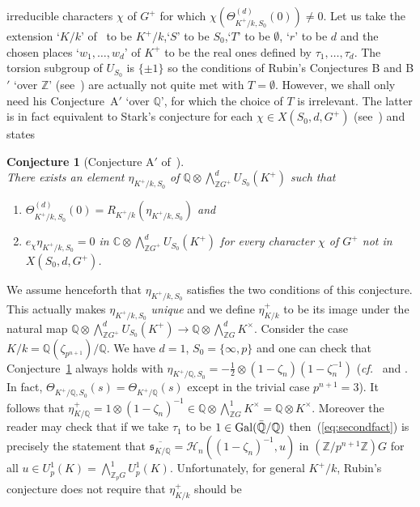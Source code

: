 \documentclass[12pt]{article}
\newtheorem{conj}{Conjecture}[section]
\newcounter{rem}[section]%
\newcommand{\barbbQ}{\ensuremath{\bar{\bbQ}}}
\newcommand{\bbC}{\ensuremath{\mathbb{C}}}
\newcommand{\bbQ}{\ensuremath{\mathbb{Q}}}
\newcommand{\bbZ}{\ensuremath{\mathbb{Z}}}
\newcommand{\cf}{\emph{cf.}}
\newcommand{\cH}{\ensuremath{\mathcal{H}}}
\newcommand{\fs}{\ensuremath{\mathfrak{s}}}
\newcommand{\Gal}{{\rm Gal}}
\newcommand{\half}{\frac{1}{2}}
\newcommand{\inv}{^{-1}}%
\newcommand{\refeq}[1]{~(\ref{eq:#1})}
\newcommand{\rem}{\refstepcounter{rem}\noindent{\sc Remark \therem}}%
\renewcommand{\therem}{\thesection.\arabic{rem}}
\newcommand{\pnpo}{\ensuremath{{p^{n+1}}}}
\begin{document}
irreducible characters $\chi$ of $G^+$ for which
$\chi(\Theta_{K^+/k, S_0}^{(d)}(0))\neq 0$. Let us take the extension
`$K/k$' of~\cite{Ru} to be $K^+/k$,`$S$' to be $S_0$,`$T$' to be $\emptyset$, `$r$' to be $d$
and the chosen places
`$w_1,\ldots,w_d$' of $K^+$ to be the real ones defined by $\tau_1,\ldots,\tau_d$.
The torsion subgroup of $U_{S_0}$ is $\{\pm 1\}$ so the conditions
of Rubin's Conjectures B and B$'$ `over $\bbZ$' (see~\cite[Hyp.~2.1]{Ru})
are actually not quite met with $T=\emptyset$.
However, we shall only need his Conjecture~A$'$ `over $\bbQ$',
for which the choice of $T$ is irrelevant. The latter is in fact equivalent to
Stark's conjecture for each
$\chi\in X(S_0,d,G^+)$ (see~\cite[Conjecture I.5.1]{Tate}) and states
\begin{conj}[Conjecture A$'$ of~\cite{Ru}]\label{conj:Rubin}\ \\
There exists an element $\eta_{K^+/k,S_0}$
of $\bbQ\otimes\bigwedge^d_{\bbZ G^+}U_{S_0}(K^+)$ such that
\begin{enumerate}
\item
$\Theta_{K^+/k, S_0}^{(d)}(0)=R_{K^+/k}(\eta_{K^+/k,S_0})$
and
\item
$e_\chi\eta_{K^+/k,S_0}=0$ in $\bbC\otimes\bigwedge^d_{\bbZ G^+}U_{S_0}(K^+)$
for every character $\chi$ of $G^+$ not in $X(S_0,d,G^+)$.
\end{enumerate}
\end{conj}
We assume henceforth that $\eta_{K^+/k,S_0}$ satisfies the two conditions of this
conjecture. This actually makes $\eta_{K^+/k,S_0}$ \emph{unique}
and we define $\eta^+_{K/k}$ to be its image under the natural map
$\bbQ\otimes\bigwedge^d_{\bbZ G^+}U_{S_0}(K^+)\rightarrow
\bbQ\otimes\bigwedge^d_{\bbZ G}K^\times$.
Consider the case $K/k=\bbQ(\zeta_\pnpo)/\bbQ$.
We have $d=1$, $S_0=\{\infty,p\}$ and
one can check that Conjecture~\ref{conj:Rubin} always holds with
$\eta_{K^+/\bbQ,S_0}=-\half\otimes(1-\zeta_n)(1-\zeta_n\inv)$ (\cf\ \cite[\S III.5]{Tate} and
\cite[\S 3.5]{zetap1}.
In fact, $\Theta_{K^+/\bbQ,S_0}(s)=\Theta_{K^+/\bbQ}(s)$ except in the
trivial case $\pnpo=3$). It follows that $\eta^+_{K/\bbQ}=1\otimes(1-\zeta_n)\inv
\in\bbQ\otimes\bigwedge^1_{\bbZ G} K^\times=\bbQ\otimes K^\times$.
Moreover the reader may check
that if we take $\tau_1$ to be $1\in\Gal(\barbbQ/\bbQ)$ then\refeq{secondfact}
is precisely the statement that
$\overline{\fs_{K/\bbQ}}=\cH_n((1-\zeta_n)\inv,u)$
in $(\bbZ/\pnpo\bbZ)G$ for all $u\in U^1_p(K)=\bigwedge^1_{\bbZ_p G} U^1_p(K)$.
Unfortunately, for general $K^+/k$, Rubin's conjecture
does not require that $\eta^+_{K/k}$ should be
\end{document}
